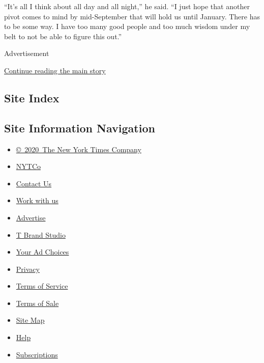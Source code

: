 ``It's all I think about all day and all night,'' he said. ``I just hope
that another pivot comes to mind by mid-September that will hold us
until January. There has to be some way. I have too many good people and
too much wisdom under my belt to not be able to figure this out.''

Advertisement

\protect\hyperlink{after-bottom}{Continue reading the main story}

\hypertarget{site-index}{%
\subsection{Site Index}\label{site-index}}

\hypertarget{site-information-navigation}{%
\subsection{Site Information
Navigation}\label{site-information-navigation}}

\begin{itemize}
\tightlist
\item
  \href{https://help.nytimes.com/hc/en-us/articles/115014792127-Copyright-notice}{©~2020~The
  New York Times Company}
\end{itemize}

\begin{itemize}
\tightlist
\item
  \href{https://www.nytco.com/}{NYTCo}
\item
  \href{https://help.nytimes.com/hc/en-us/articles/115015385887-Contact-Us}{Contact
  Us}
\item
  \href{https://www.nytco.com/careers/}{Work with us}
\item
  \href{https://nytmediakit.com/}{Advertise}
\item
  \href{http://www.tbrandstudio.com/}{T Brand Studio}
\item
  \href{https://www.nytimes.com/privacy/cookie-policy\#how-do-i-manage-trackers}{Your
  Ad Choices}
\item
  \href{https://www.nytimes.com/privacy}{Privacy}
\item
  \href{https://help.nytimes.com/hc/en-us/articles/115014893428-Terms-of-service}{Terms
  of Service}
\item
  \href{https://help.nytimes.com/hc/en-us/articles/115014893968-Terms-of-sale}{Terms
  of Sale}
\item
  \href{https://spiderbites.nytimes.com}{Site Map}
\item
  \href{https://help.nytimes.com/hc/en-us}{Help}
\item
  \href{https://www.nytimes.com/subscription?campaignId=37WXW}{Subscriptions}
\end{itemize}
